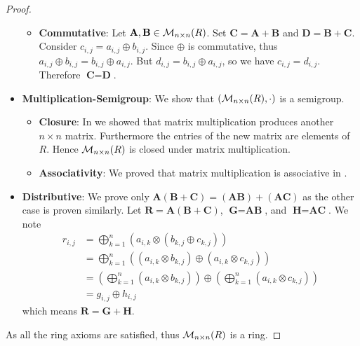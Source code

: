 \begin{proof}
\begin{itemize}
\begin{itemize}
            \item \textbf{Commutative}: Let $\textbf{A}, \textbf{B} \in \mathcal{M}_{n\times n}(R)$. Set $\textbf{C} = \textbf{A} + \textbf{B}$ and $\textbf{D} = \textbf{B} + \textbf{C}$. Consider $c_{i,j} = a_{i,j} \oplus b_{i,j}$. Since $\oplus$ is commutative, thus $a_{i,j} \oplus b_{i,j} = b_{i,j} \oplus a_{i,j}$. But $d_{i,j} = b_{i,j} \oplus a_{i,j}$, so we have $c_{i,j} = d_{i,j}$. Therefore $\textbf{C} = \textbf{D}$.
        \end{itemize}

        \item \textbf{Multiplication-Semigroup}: We show that $(\mathcal{M}_{n\times n}(R), \cdot)$ is a semigroup.
        \begin{itemize}
            \item \textbf{Closure}: In  we showed that matrix multiplication produces another $n \times n$ matrix. Furthermore the entries of the new matrix are elements of $R$. Hence $\mathcal{M}_{n\times n}(R)$ is closed under matrix multiplication.
        
            \item \textbf{Associativity}: We proved that matrix multiplication is associative in .
        \end{itemize}
        
        \item \textbf{Distributive}: We prove only $\textbf{A}(\textbf{B} + \textbf{C}) = (\textbf{AB}) + (\textbf{AC})$ as the other case is proven similarly. Let $\textbf{R} = \textbf{A}(\textbf{B} + \textbf{C})$, $\textbf{G} = \textbf{AB}$, and $\textbf{H} = \textbf{AC}$. We note
        \begin{align*}
            r_{i,j} &= \bigoplus_{k=1}^n \left(a_{i,k} \otimes \left(b_{k,j} \oplus c_{k,j}\right)\right)\\
            &= \bigoplus_{k=1}^n \left((a_{i,k} \otimes b_{k,j}) \oplus (a_{i,k} \otimes c_{k,j})\right)\\
            &= \left(\bigoplus_{k=1}^n (a_{i,k} \otimes b_{k,j})\right) \oplus \left(\bigoplus_{k=1}^n (a_{i,k} \otimes c_{k,j})\right)\\
            &= g_{i,j}\oplus h_{i,j}
        \end{align*}
        which means $\textbf{R} = \textbf{G} + \textbf{H}$.
    \end{itemize}
    As all the ring axioms are satisfied, thus $\mathcal{M}_{n\times n}(R)$ is a ring.


\end{proof}

